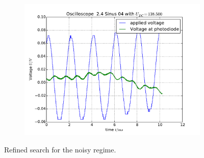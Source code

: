 \begin{figure}
\begin{subfigure}[b]{\picwidth}
        \caption{}
    \end{subfigure}
    \begin{subfigure}[b]{\picwidth}
        \includegraphics[width=\textwidth]{analysis/figures/24sinus04}
        \caption{}
    \end{subfigure}
    \caption{Refined search for the noisy regime.}
    \label{fig:sinus5}
\end{figure}
\clearpage
